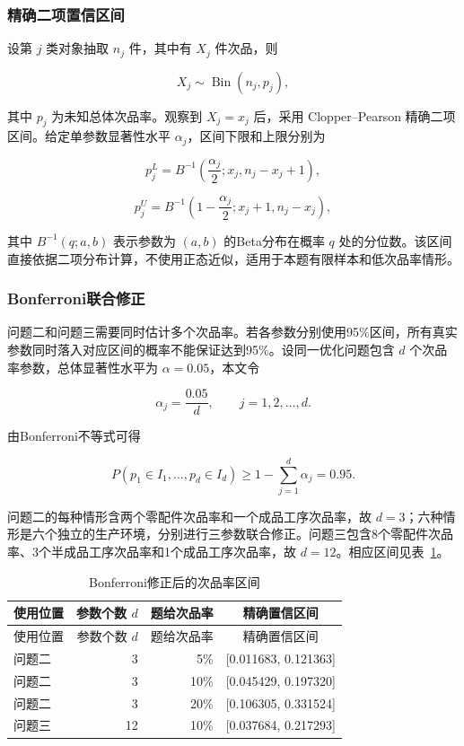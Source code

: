\documentclass{cumcm}
\numberwithin{figure}{section}
\numberwithin{table}{section}
\begin{document}
\subsubsection{精确二项置信区间}\label{ux7cbeux786eux4e8cux9879ux7f6eux4fe1ux533aux95f4}

设第 \(j\) 类对象抽取 \(n_j\) 件，其中有 \(X_j\) 件次品，则

\[
X_j\sim\operatorname{Bin}(n_j,p_j),
\]

其中 \(p_j\) 为未知总体次品率。观察到 \(X_j=x_j\) 后，采用 Clopper--Pearson 精确二项区间。给定单参数显著性水平 \(\alpha_j\)，区间下限和上限分别为

\[
p_j^L=B^{-1}\left(\frac{\alpha_j}{2};x_j,n_j-x_j+1\right),
\]

\[
p_j^U=B^{-1}\left(1-\frac{\alpha_j}{2};x_j+1,n_j-x_j\right),
\]

其中 \(B^{-1}(q;a,b)\) 表示参数为 \((a,b)\) 的Beta分布在概率 \(q\) 处的分位数。该区间直接依据二项分布计算，不使用正态近似，适用于本题有限样本和低次品率情形。

\subsubsection{Bonferroni联合修正}\label{bonferroniux8054ux5408ux4feeux6b63}

问题二和问题三需要同时估计多个次品率。若各参数分别使用95\%区间，所有真实参数同时落入对应区间的概率不能保证达到95\%。设同一优化问题包含 \(d\) 个次品率参数，总体显著性水平为 \(\alpha=0.05\)，本文令

\[
\alpha_j=\frac{0.05}{d},\qquad j=1,2,\ldots,d.
\]

由Bonferroni不等式可得

\[
P\left(p_1\in I_1,\ldots,p_d\in I_d\right)
\geq 1-\sum_{j=1}^{d}\alpha_j=0.95.
\]

问题二的每种情形含两个零配件次品率和一个成品工序次品率，故 \(d=3\)；六种情形是六个独立的生产环境，分别进行三参数联合修正。问题三包含8个零配件次品率、3个半成品工序次品率和1个成品工序次品率，故 \(d=12\)。相应区间见表~\ref{tab:p4-bonferroni-intervals}。

\begin{longtable}[]{@{}lrrc@{}}
\caption{Bonferroni修正后的次品率区间}\label{tab:p4-bonferroni-intervals}\tabularnewline
\toprule\noalign{}
使用位置 & 参数个数 \(d\) & 题给次品率 & 精确置信区间 \\
\midrule\noalign{}
\endfirsthead
\toprule\noalign{}
使用位置 & 参数个数 \(d\) & 题给次品率 & 精确置信区间 \\
\midrule\noalign{}
\endhead
\bottomrule\noalign{}
\endlastfoot
问题二 & 3 & 5\% & {[}0.011683, 0.121363{]} \\
问题二 & 3 & 10\% & {[}0.045429, 0.197320{]} \\
问题二 & 3 & 20\% & {[}0.106305, 0.331524{]} \\
问题三 & 12 & 10\% & {[}0.037684, 0.217293{]} \\
\end{longtable}
\end{document}
